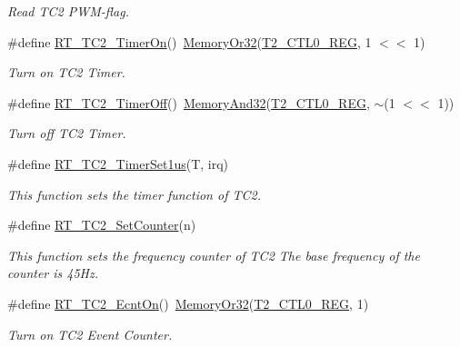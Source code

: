 \begin{DoxyCompactItemize}
\begin{DoxyCompactList}\small\item\em Read T\+C2 P\+W\+M-\/flag. \end{DoxyCompactList}\item 
\#define \mbox{\hyperlink{a00047_ab274ee44af2080d68745b2ec3af06648}{R\+T\+\_\+\+T\+C2\+\_\+\+Timer\+On}}()~\mbox{\hyperlink{a00020_a27874a97deab7cecdde5ddecf466e31e}{Memory\+Or32}}(\mbox{\hyperlink{a00020_adadaa0ab1ebbd7ba9b70dfd24c3ed44daf2e9deb36631241181cbf09e8d959475}{T2\+\_\+\+C\+T\+L0\+\_\+\+R\+EG}}, 1 $<$$<$ 1)
\begin{DoxyCompactList}\small\item\em Turn on T\+C2 Timer. \end{DoxyCompactList}\item 
\#define \mbox{\hyperlink{a00047_a4328299fe0323ef75508eadf9b937ba1}{R\+T\+\_\+\+T\+C2\+\_\+\+Timer\+Off}}()~\mbox{\hyperlink{a00020_ad87cedffcaadc51db22594fce55173d4}{Memory\+And32}}(\mbox{\hyperlink{a00020_adadaa0ab1ebbd7ba9b70dfd24c3ed44daf2e9deb36631241181cbf09e8d959475}{T2\+\_\+\+C\+T\+L0\+\_\+\+R\+EG}}, $\sim$(1 $<$$<$ 1))
\begin{DoxyCompactList}\small\item\em Turn off T\+C2 Timer. \end{DoxyCompactList}\item 
\#define \mbox{\hyperlink{a00047_a005265e28d070ee73720939fca9a815a}{R\+T\+\_\+\+T\+C2\+\_\+\+Timer\+Set1us}}(T,  irq)
\begin{DoxyCompactList}\small\item\em This function sets the timer function of T\+C2. \end{DoxyCompactList}\item 
\#define \mbox{\hyperlink{a00047_a28ff54e7b5cd20e082ea21b6731d5b51}{R\+T\+\_\+\+T\+C2\+\_\+\+Set\+Counter}}(n)
\begin{DoxyCompactList}\small\item\em This function sets the frequency counter of T\+C2 The base frequency of the counter is 45\+Hz. \end{DoxyCompactList}\item 
\#define \mbox{\hyperlink{a00047_a261544e2cbdbdeee0d22734b29827cd2}{R\+T\+\_\+\+T\+C2\+\_\+\+Ecnt\+On}}()~\mbox{\hyperlink{a00020_a27874a97deab7cecdde5ddecf466e31e}{Memory\+Or32}}(\mbox{\hyperlink{a00020_adadaa0ab1ebbd7ba9b70dfd24c3ed44daf2e9deb36631241181cbf09e8d959475}{T2\+\_\+\+C\+T\+L0\+\_\+\+R\+EG}}, 1)
\begin{DoxyCompactList}\small\item\em Turn on T\+C2 Event Counter. \end{DoxyCompactList}\item 

\end{DoxyCompactItemize}
